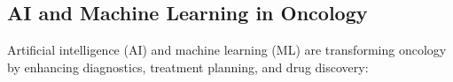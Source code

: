 
\subsection{AI and Machine Learning in Oncology}

Artificial intelligence (AI) and machine learning (ML) are transforming oncology by enhancing 
diagnostics, treatment planning, and drug discovery:

